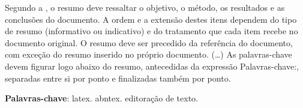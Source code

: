 \documentclass[
	12pt,				%
	openright,			%
	oneside,			%
	a4paper,			%
	english,			%
	french,				%
	spanish,			%
	brazil				%
	]{abntex2}
\begin{document}



\setlength{\absparsep}{18pt} %
\begin{resumo}
 Segundo a , o resumo deve ressaltar o
 objetivo, o método, os resultados e as conclusões do documento. A ordem e a extensão
 destes itens dependem do tipo de resumo (informativo ou indicativo) e do
 tratamento que cada item recebe no documento original. O resumo deve ser
 precedido da referência do documento, com exceção do resumo inserido no
 próprio documento. (\ldots) As palavras-chave devem figurar logo abaixo do
 resumo, antecedidas da expressão Palavras-chave:, separadas entre si por
 ponto e finalizadas também por ponto.

 \textbf{Palavras-chave}: latex. abntex. editoração de texto.
\end{resumo}

% 
% 


\listoffigures*
\cleardoublepage
\end{document}
